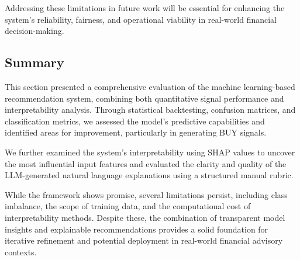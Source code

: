 \bigskip

Addressing these limitations in future work will be essential for enhancing the system’s reliability, fairness, and operational viability in real-world financial decision-making.

\subsection{Summary}

This section presented a comprehensive evaluation of the machine learning-based recommendation system, combining both quantitative signal performance and interpretability analysis. Through statistical backtesting, confusion matrices, and classification metrics, we assessed the model’s predictive capabilities and identified areas for improvement, particularly in generating BUY signals.

We further examined the system’s interpretability using SHAP values to uncover the most influential input features and evaluated the clarity and quality of the LLM-generated natural language explanations using a structured manual rubric.

While the framework shows promise, several limitations persist, including class imbalance, the scope of training data, and the computational cost of interpretability methods. Despite these, the combination of transparent model insights and explainable recommendations provides a solid foundation for iterative refinement and potential deployment in real-world financial advisory contexts.
